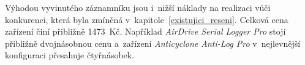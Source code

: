 Výhodou vyvinutého záznamníku jsou i~nižší náklady na realizaci vůči konkurenci, která byla zmíněná v~kapitole~\ref{existujici_reseni}. Celková cena zařízení činí přibližně 1473~Kč. Například \textit{AirDrive Serial Logger Pro} stojí přibližně dvojnásobnou cenu a~zařízení \textit{Anticyclone Anti-Log Pro} v~nejlevnější konfiguraci přesahuje čtyřnásobek.



%
